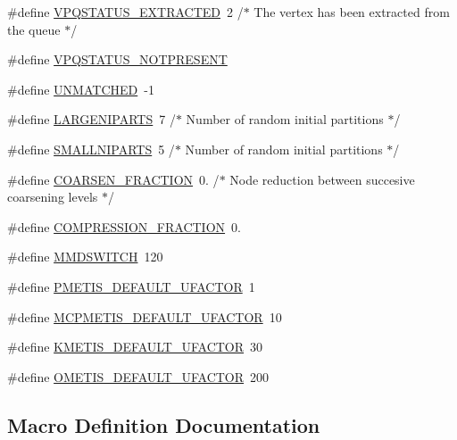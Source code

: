 \begin{DoxyCompactItemize}
\#define \hyperlink{a00888_ab1f6480964358ec850d71ea7b761cccb}{V\+P\+Q\+S\+T\+A\+T\+U\+S\+\_\+\+E\+X\+T\+R\+A\+C\+T\+ED}~2       /$\ast$ The vertex has been extracted from the queue $\ast$/
\item 
\#define \hyperlink{a00888_a671e4437e2b75701b4e1a99f5f6385ef}{V\+P\+Q\+S\+T\+A\+T\+U\+S\+\_\+\+N\+O\+T\+P\+R\+E\+S\+E\+NT}
\item 
\#define \hyperlink{a00888_a3df907ae5b8fa1f3019607d02e870241}{U\+N\+M\+A\+T\+C\+H\+ED}~-\/1
\item 
\#define \hyperlink{a00888_ac631d2276c3103e2f63df2ba63f7d130}{L\+A\+R\+G\+E\+N\+I\+P\+A\+R\+TS}~7	/$\ast$ Number of random initial partitions $\ast$/
\item 
\#define \hyperlink{a00888_a694c96b6d675c1e6caded24379d303ba}{S\+M\+A\+L\+L\+N\+I\+P\+A\+R\+TS}~5	/$\ast$ Number of random initial partitions $\ast$/
\item 
\#define \hyperlink{a00888_adb4607db4a6c109d0dc843b54d63502e}{C\+O\+A\+R\+S\+E\+N\+\_\+\+F\+R\+A\+C\+T\+I\+ON}~0.	/$\ast$ Node reduction between succesive coarsening levels $\ast$/
\item 
\#define \hyperlink{a00888_afa7e38d152ab06e05cf89b9a49e4fa69}{C\+O\+M\+P\+R\+E\+S\+S\+I\+O\+N\+\_\+\+F\+R\+A\+C\+T\+I\+ON}~0.
\item 
\#define \hyperlink{a00888_a375efdb327916951e1960cf53f0f127f}{M\+M\+D\+S\+W\+I\+T\+CH}~120
\item 
\#define \hyperlink{a00888_a2d23b2175e2aa734796932663a588c95}{P\+M\+E\+T\+I\+S\+\_\+\+D\+E\+F\+A\+U\+L\+T\+\_\+\+U\+F\+A\+C\+T\+OR}~1
\item 
\#define \hyperlink{a00888_ade4fbe8a01581acb60a8ecf7a9c80a51}{M\+C\+P\+M\+E\+T\+I\+S\+\_\+\+D\+E\+F\+A\+U\+L\+T\+\_\+\+U\+F\+A\+C\+T\+OR}~10
\item 
\#define \hyperlink{a00888_aab3f3c963820119e3a8033e97c1189a0}{K\+M\+E\+T\+I\+S\+\_\+\+D\+E\+F\+A\+U\+L\+T\+\_\+\+U\+F\+A\+C\+T\+OR}~30
\item 
\#define \hyperlink{a00888_a3265afce22da51620233aa53da9456d6}{O\+M\+E\+T\+I\+S\+\_\+\+D\+E\+F\+A\+U\+L\+T\+\_\+\+U\+F\+A\+C\+T\+OR}~200
\end{DoxyCompactItemize}


\subsection{Macro Definition Documentation}
\mbox{\label{a00888_aa84d7d58d23dd7cd43633ad60f34a4ab}} 
